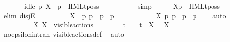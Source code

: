 \begin{isabellebody}
\ \ \ \ \ \ {\isasymor}\ idle\ p\ X\ {\isasymand}\ p\ {\isasymTTurnstile}\ HMLt{\isacharunderscore}{\kern0pt}poss\ {\isasymalpha}\ {\isasymphi}{\isacartoucheclose}\ \isanewline
\ \ \ \ \ \ \isamarkupfalse%
\ simp\isanewline
\ \ \ \ \isamarkupfalse%
\ {\isacartoucheopen}{\isasymtheta}{\isacharbrackleft}{\kern0pt}X{\isacharbrackright}{\kern0pt}{\isacharparenleft}{\kern0pt}p{\isacharparenright}{\kern0pt}\ {\isasymTurnstile}\ {\isasymsigma}{\isacharparenleft}{\kern0pt}HMLt{\isacharunderscore}{\kern0pt}poss\ {\isasymalpha}\ {\isasymphi}{\isacharparenright}{\kern0pt}{\isacartoucheclose}\isanewline
\ \ \ \ \isamarkupfalse%
\ {\isacharparenleft}{\kern0pt}elim\ disjE{\isacharparenright}{\kern0pt}\isanewline
\ \ \ \ \ \ \isamarkupfalse%
\ {\isacartoucheopen}{\isasymalpha}\ {\isasymin}\ X\ {\isasymand}\ {\isacharparenleft}{\kern0pt}{\isasymexists}p{\isacharprime}{\kern0pt}{\isachardot}{\kern0pt}\ p\ {\isasymlongmapsto}{\isasymalpha}\ p{\isacharprime}{\kern0pt}\ {\isasymand}\ p{\isacharprime}{\kern0pt}\ {\isasymTTurnstile}\ {\isasymphi}{\isacharparenright}{\kern0pt}{\isacartoucheclose}\isanewline
\ \ \ \ \ \ \isamarkupfalse%
\ {\isacartoucheopen}{\isasymalpha}\ {\isasymin}\ X{\isacartoucheclose}\ {\isacartoucheopen}{\isasymexists}p{\isacharprime}{\kern0pt}{\isachardot}{\kern0pt}\ p\ {\isasymlongmapsto}{\isasymalpha}\ p{\isacharprime}{\kern0pt}\ {\isasymand}\ p{\isacharprime}{\kern0pt}\ {\isasymTTurnstile}\ {\isasymphi}{\isacartoucheclose}\ \isamarkupfalse%
\ auto\isanewline
\isanewline
\ \ \ \ \ \ \isamarkupfalse%
\ {\isacartoucheopen}{\isasymalpha}\ {\isasymin}\ X{\isacartoucheclose}\ {\isacartoucheopen}X\ {\isasymsubseteq}\ visible{\isacharunderscore}{\kern0pt}actions{\isacartoucheclose}\ \isamarkupfalse%
\ {\isacartoucheopen}{\isasymalpha}\ {\isasymnoteq}\ {\isasymtau}\ {\isasymand}\ {\isasymalpha}\ {\isasymnoteq}\ t\ {\isasymand}\ {\isasymalpha}\ {\isasymnoteq}\ t{\isacharunderscore}{\kern0pt}{\isasymepsilon}\ {\isasymand}\ {\isacharparenleft}{\kern0pt}{\isasymforall}X{\isachardot}{\kern0pt}\ {\isasymalpha}\ {\isasymnoteq}\ {\isasymepsilon}{\isacharbrackleft}{\kern0pt}X{\isacharbrackright}{\kern0pt}{\isacharparenright}{\kern0pt}{\isacartoucheclose}\isanewline
\ \ \ \ \ \ \ \ \isamarkupfalse%
\ no{\isacharunderscore}{\kern0pt}epsilon{\isacharunderscore}{\kern0pt}in{\isacharunderscore}{\kern0pt}tran\ visible{\isacharunderscore}{\kern0pt}actions{\isacharunderscore}{\kern0pt}def\ \isamarkupfalse%
\ auto\isanewline

\end{isabellebody}
